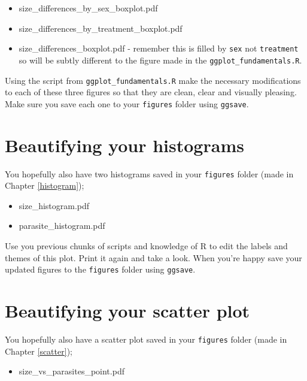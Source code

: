 \documentclass[
]{book}
\providecommand{\tightlist}{%
  \setlength{\itemsep}{0pt}\setlength{\parskip}{0pt}}
\begin{document}
\begin{itemize}
\tightlist
\item
  size\_differences\_by\_sex\_boxplot.pdf
\item
  size\_differences\_by\_treatment\_boxplot.pdf
\item
  size\_differences\_boxplot.pdf - remember this is filled by \texttt{sex} not \texttt{treatment} so will be subtly different to the figure made in the \texttt{ggplot\_fundamentals.R}.
\end{itemize}

Using the script from \texttt{ggplot\_fundamentals.R} make the necessary modifications to each of these three figures so that they are clean, clear and visually pleasing. Make sure you save each one to your \texttt{figures} folder using \texttt{ggsave}.

\hypertarget{beautifying-your-histograms}{%
\section{Beautifying your histograms}\label{beautifying-your-histograms}}

You hopefully also have two histograms saved in your \texttt{figures} folder (made in Chapter \ref{histogram});

\begin{itemize}
\tightlist
\item
  size\_histogram.pdf
\item
  parasite\_histogram.pdf
\end{itemize}

Use you previous chunks of scripts and knowledge of R to edit the labels and themes of this plot. Print it again and take a look. When you're happy save your updated figures to the \texttt{figures} folder using \texttt{ggsave}.

\hypertarget{beautifying-your-scatter-plot}{%
\section{Beautifying your scatter plot}\label{beautifying-your-scatter-plot}}

You hopefully also have a scatter plot saved in your \texttt{figures} folder (made in Chapter \ref{scatter});

\begin{itemize}
\tightlist
\item
  size\_vs\_parasites\_point.pdf
\end{itemize}
\end{document}
